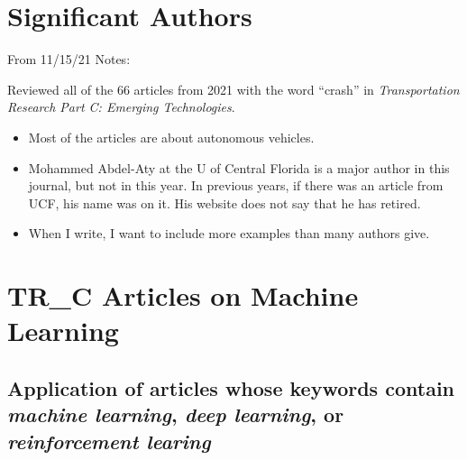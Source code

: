 \section{Significant Authors}

From 11/15/21 Notes:

Reviewed all of the 66 articles from 2021 with the word ``crash''  in {\it Transportation Research Part C:  Emerging Technologies}. 

\begin{itemize}
	\item Most of the articles are about autonomous vehicles.
	\item Mohammed Abdel-Aty at the U of Central Florida is a major author in this journal, but not in this year.  In previous years, if there was an article from UCF, his name was on it.  His website does not say that he has retired.  
	\item When I write, I want to include more examples than many authors give.  
\end{itemize}

\section{TR\_C Articles on Machine Learning}

\subsection{Application of articles whose keywords contain {\it machine learning}, {\it deep learning}, or {\it reinforcement learing}}

